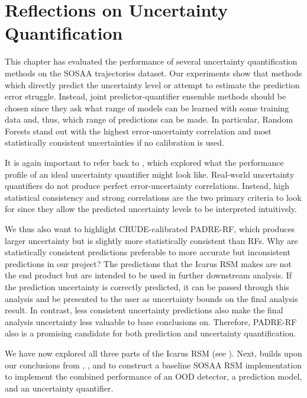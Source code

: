 \section{Reflections on Uncertainty Quantification} \label{txt:uncertainty-conclusions}

This chapter has evaluated the performance of several uncertainty quantification methods on the SOSAA trajectories dataset. Our experiments show that methods which directly predict the uncertainty level or attempt to estimate the prediction error struggle. Instead, joint predictor-quantifier ensemble methods should be chosen since they ask what range of models can be learned with some training data and, thus, which range of predictions can be made. In particular, Random Forests stand out with the highest error-uncertainty correlation and most statistically consistent uncertainties if no calibration is used.

It is again important to refer back to , which explored what the performance profile of an ideal uncertainty quantifier might look like. Real-world uncertainty quantifiers do not produce perfect error-uncertainty correlations. Instead, high statistical consistency and strong correlations are the two primary criteria to look for since they allow the predicted uncertainty levels to be interpreted intuitively.

We thus also want to highlight CRUDE-calibrated PADRE-RF, which produces larger uncertainty but is slightly more statistically consistent than RFs. Why are statistically consistent predictions preferable to more accurate but inconsistent predictions in our project? The predictions that the Icarus RSM makes are not the end product but are intended to be used in further downstream analysis. If the prediction uncertainty is correctly predicted, it can be passed through this analysis and be presented to the user as uncertainty bounds on the final analysis result. In contrast, less consistent uncertainty predictions also make the final analysis uncertainty less valuable to base conclusions on. Therefore, PADRE-RF also is a promising candidate for both prediction and uncertainty quantification.

\newpar We have now explored all three parts of the Icarus RSM (see ). Next,  builds upon our conclusions from , , and  to construct a baseline SOSAA RSM implementation to implement the combined performance of an OOD detector, a prediction model, and an uncertainty quantifier.
